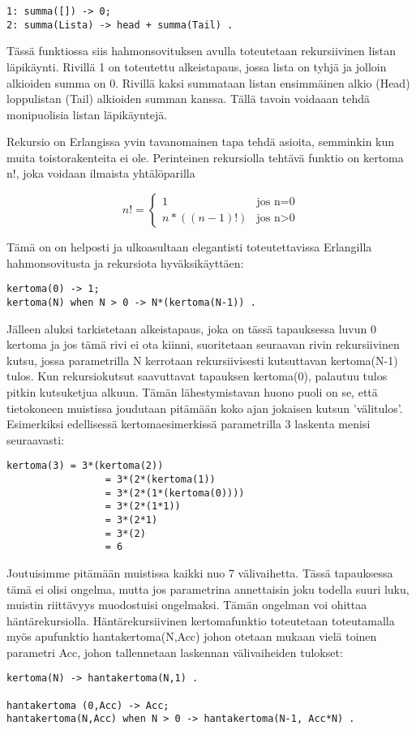 \documentclass[11pt,oneside,a4paper]{article}
\begin{document}
\begin{verbatim}
1: summa([]) -> 0;
2: summa(Lista) -> head + summa(Tail) .  
\end{verbatim}


Tässä funktiossa siis hahmonsovituksen avulla toteutetaan rekursiivinen listan
läpikäynti. Rivillä 1 on toteutettu alkeistapaus, jossa lista on tyhjä ja
jolloin alkioiden summa on 0. Rivillä kaksi summataan listan ensimmäinen alkio
(Head) loppulistan 
(Tail) alkioiden summan kanssa. Tällä tavoin voidaaan tehdä monipuolisia listan
läpikäyntejä. 

Rekursio on Erlangissa yvin tavanomainen tapa tehdä asioita, semminkin kun muita
toistorakenteita ei ole. Perinteinen rekursiolla tehtävä funktio on kertoma n!,
joka voidaan ilmaista yhtälöparilla 

\begin{displaymath}
n! = \left\{ \begin{array}{ll}
1 & \textrm{jos n=0}\\
n*((n-1)!) & \textrm{{jos n>0}}
\end{array} \right.
\end{displaymath}

Tämä on on helposti ja ulkoasultaan elegantisti toteutettavissa Erlangilla
hahmonsovitusta ja rekursiota hyväksikäyttäen:
\begin{verbatim}
kertoma(0) -> 1;
kertoma(N) when N > 0 -> N*(kertoma(N-1)) .
\end{verbatim}
Jälleen aluksi tarkistetaan alkeistapaus, joka on tässä tapauksessa luvun 0
kertoma ja jos tämä rivi ei ota kiinni, suoritetaan seuraavan rivin
rekursiivinen kutsu, jossa parametrilla N kerrotaan rekursiivisesti kutsuttavan
kertoma(N-1) tulos.
Kun rekursiokutsut saavuttavat tapauksen kertoma(0), palautuu tulos pitkin
kutsuketjua alkuun. Tämän lähestymistavan huono puoli on se, että tietokoneen
muistissa joudutaan pitämään koko ajan jokaisen kutsun 'välitulos'. Esimerkiksi
edellisessä 
kertomaesimerkissä parametrilla 3 laskenta menisi seuraavasti:
\begin{verbatim}
kertoma(3) = 3*(kertoma(2))
                 = 3*(2*(kertoma(1))
                 = 3*(2*(1*(kertoma(0))))
                 = 3*(2*(1*1))
                 = 3*(2*1)
                 = 3*(2)
                 = 6
\end{verbatim}
Joutuisimme pitämään muistissa kaikki nuo 7 välivaihetta. Tässä tapauksessa tämä
ei olisi ongelma, mutta jos parametrina annettaisin joku todella suuri luku,
muistin riittävyys muodostuisi ongelmaksi. 
Tämän ongelman voi ohittaa häntärekursiolla. Häntärekursiivinen kertomafunktio
toteutetaan toteutamalla myös apufunktio hantakertoma(N,Acc) johon otetaan
mukaan vielä toinen parametri Acc, johon tallennetaan laskennan 
välivaiheiden tulokset:
\begin{verbatim}
kertoma(N) -> hantakertoma(N,1) .

hantakertoma (0,Acc) -> Acc;
hantakertoma(N,Acc) when N > 0 -> hantakertoma(N-1, Acc*N) .
\end{verbatim}
\end{document}
